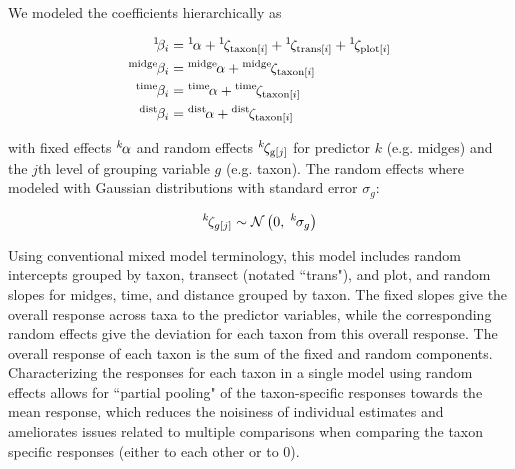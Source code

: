 \noindent We modeled the coefficients hierarchically as

\begin{equation} \label{eq:betas}
\begin{split}
    {}^1\hspace*{-2pt}\beta_i &= {}^1\hspace*{-1pt}\alpha +
        {}^1\hspace*{-1pt}\zeta_{\text{taxon}[i]} +
        {}^1\hspace*{-1pt}\zeta_{\text{trans}[i]} +
        {}^1\hspace*{-1pt}\zeta_{\text{plot}[i]} \\
    {}^\text{midge}\hspace*{-1pt}\beta_i &= {}^\text{midge}\hspace*{-1pt}\alpha +
            {}^\text{midge}\hspace*{-1pt}\zeta_{\text{taxon}[i]} \\
    {}^\text{time}\hspace*{-1pt}\beta_i &= {}^\text{time}\hspace*{-1pt}\alpha +
            {}^\text{time}\hspace*{-1pt}\zeta_{\text{taxon}[i]} \\
    {}^\text{dist}\hspace*{-1pt}\beta_i &= {}^\text{dist}\hspace*{-1pt}\alpha +
            {}^\text{dist}\hspace*{-1pt}\zeta_{\text{taxon}[i]}
\end{split}
\end{equation}

\noindent with fixed effects ${}^k\hspace*{-1pt}\alpha$ and random effects
${}^k\hspace*{-1pt}\zeta_{\text{g}[j]}$ for predictor $k$ (e.g. midges)
and the $j$th level of grouping variable $g$ (e.g. taxon).
The random effects where modeled with Gaussian distributions with
standard error $\sigma_g$:

\begin{equation} \label{eq:zetas}
    {}^k\hspace*{-1pt}\zeta_{g[j]} \sim
        \mathcal{N}\left(0, \; {}^k\hspace*{-1pt}\sigma_g \right)
\end{equation}

Using conventional mixed model terminology, this model includes random intercepts
grouped by taxon, transect (notated ``trans"), and plot, and random slopes for midges,
time, and distance grouped by taxon.
The fixed slopes give the overall response across taxa to the predictor variables,
while the corresponding random effects give the deviation for each taxon from
this overall response.
The overall response of each taxon is the sum of the fixed and random components.
Characterizing the responses for each taxon in a single model using random effects
allows for ``partial pooling" of the taxon-specific responses towards the mean response,
which reduces the noisiness of individual estimates and ameliorates issues
related to multiple comparisons when comparing the taxon specific responses
(either to each other or to 0).

